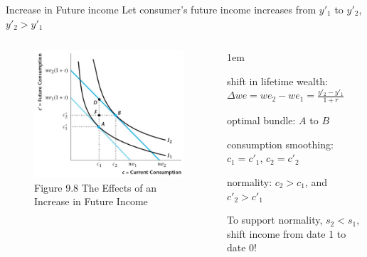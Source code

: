 \documentclass[11pt,aspectratio=43]{beamer}
\let\olditemize=\itemize
\let\endolditemize=\enditemize
\renewenvironment{itemize}{\olditemize \itemsep1em}{\endolditemize}
\theoremstyle{definition}
\begin{document}
\begin{frame}{Increase in Future income}
\label{slide:Increase_in_Current_income}
    Let consumer's \alert{future} income increases from $ y'_1 $ to $ y'_{2}$, $ y'_{2} > y'_{1} $
    \begin{columns}
        \begin{column}{0.5\textwidth}
            \begin{figure}
                \caption{\scriptsize Figure 9.8  The Effects of an Increase in Future Income}
                \includegraphics[width=\textwidth]{./figures/Figure9_8.jpg}
            \end{figure}
        \end{column}
        \begin{column}{0.5\textwidth}
            \begin{itemize}
                \item shift in lifetime wealth:
                        $ \displaystyle \Delta we = we_{2} - we_{1} = \frac{y'_{2} - y'_{1}}{1+r} $
                \item optimal bundle: $ A $ to $ B $
                \item consumption smoothing: $c_{1} = c'_{1}$, $c_{2} = c'_{2}$
                \item normality: $ c_{2} > c_{1} $, and $ c'_{2} > c'_{1} $
                \item To support normality, \alert{$ s_{2} < s_{1} $}, shift income from date 1 to date 0!
            \end{itemize}
        \end{column}
    \end{columns}
\end{frame}
\end{document}
